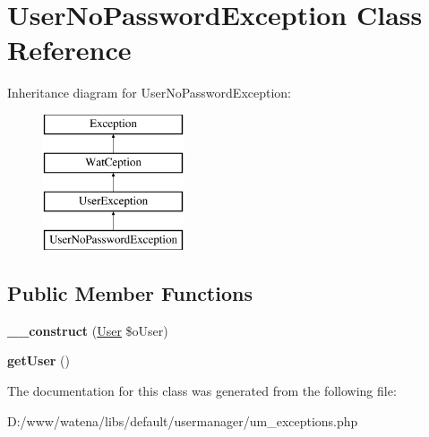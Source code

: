 \hypertarget{class_user_no_password_exception}{\section{User\-No\-Password\-Exception Class Reference}
\label{class_user_no_password_exception}
}
Inheritance diagram for User\-No\-Password\-Exception\-:\begin{figure}[H]
\begin{center}
\leavevmode
\includegraphics[height=4.000000cm]{class_user_no_password_exception}
\end{center}
\end{figure}
\subsection*{Public Member Functions}
\begin{DoxyCompactItemize}
\item 
\hypertarget{class_user_no_password_exception_a63427e1452be501be311c214b227ea6b}{{\bfseries \-\_\-\-\_\-construct} (\hyperlink{class_user}{User} \$o\-User)}\label{class_user_no_password_exception_a63427e1452be501be311c214b227ea6b}

\item 
\hypertarget{class_user_no_password_exception_a638f3a4eaf728cc319f029fe68bc4554}{{\bfseries get\-User} ()}\label{class_user_no_password_exception_a638f3a4eaf728cc319f029fe68bc4554}

\end{DoxyCompactItemize}


The documentation for this class was generated from the following file\-:\begin{DoxyCompactItemize}
\item 
D\-:/www/watena/libs/default/usermanager/um\-\_\-exceptions.\-php\end{DoxyCompactItemize}
